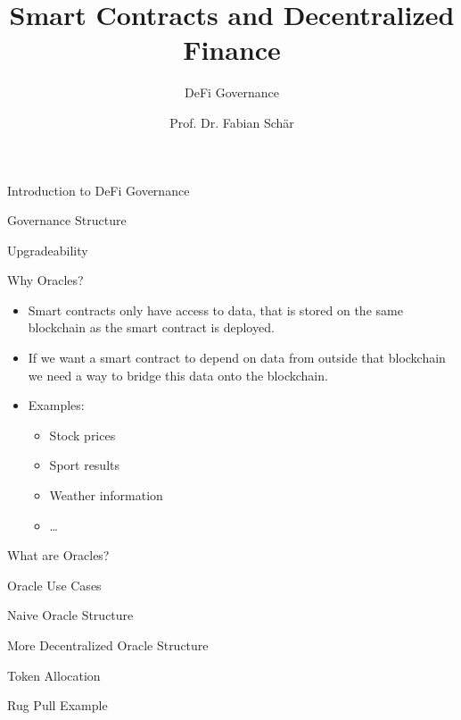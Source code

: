 \documentclass[handout]{beamer}
\title{Smart Contracts and Decentralized Finance}
\subtitle{DeFi Governance}
\author{Prof. Dr. Fabian Schär}
\institute{University of Basel}
\begin{document}
\thispagestyle{empty}
\begin{frame}[noframenumbering]
	\titlepage
\end{frame}

\begin{frame}{Introduction to DeFi Governance}

\end{frame}

\begin{frame}{Governance Structure}

\end{frame}

\begin{frame}{Upgradeability}

\end{frame}

\begin{frame}{Why Oracles?}
	\begin{itemize}
		\item Smart contracts only have access to data, that is stored on the same blockchain as the smart contract is deployed.
		\item If we want a smart contract to depend on data from outside that blockchain we need a way to bridge this data onto the blockchain.
		\item Examples:
		\begin{itemize}
			\item Stock prices
			\item Sport results
			\item Weather information
			\item …
		\end{itemize}
	\end{itemize}
\end{frame}

\begin{frame}{What are Oracles?}

\end{frame}

\begin{frame}{Oracle Use Cases}

\end{frame}

\begin{frame}{Naive Oracle Structure}

\end{frame}


\begin{frame}{More Decentralized Oracle Structure}

\end{frame}


\begin{frame}{Token Allocation}

\end{frame}

\begin{frame}{Rug Pull Example}

\end{frame}
\end{document}
